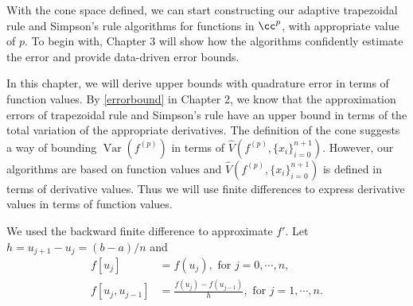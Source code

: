 \documentclass{iitthesis}
\DeclareMathOperator{\Var}{Var}
\theoremstyle{definition}
\theoremstyle{remark}
\begin{document}
With the cone space defined, we can start constructing our adaptive trapezoidal rule and Simpson's rule algorithms for functions in $\cc^{p}$, with appropriate value of $p$. To begin with, Chapter 3 will show how the algorithms confidently estimate the error and provide data-driven error bounds.





In this chapter, we will derive upper bounds with quadrature error in terms of function values. By \eqref{errorbound} in Chapter 2, we know that the approximation errors of trapezoidal rule and Simpson's rule have an upper bound in terms of the total variation of the appropriate derivatives. The definition of the cone suggests a way of bounding $\Var(f^{(p)})$ in terms of $\widehat{V}(f^{(p)},\{x_i\}_{i=0}^{n+1})$. However, our algorithms are based on function values and $\widehat{V}(f^{(p)},\{x_i\}_{i=0}^{n+1})$ is defined in terms of derivative values. Thus we will use finite differences to express derivative values in terms of function values.


We used the backward finite difference to approximate $f'$. Let $h=u_{j+1}-u_{j}=(b-a)/n$ and
\begin{align*}
  f[u_{j}]&=f(u_{j}), \text{ for } j=0,\cdots, n,\\
  f[u_{j},u_{j-1}]&=\frac{f(u_{j})-f(u_{j-1})}{h},\text{ for } j=1, \cdots, n.
\end{align*}
\end{document}
